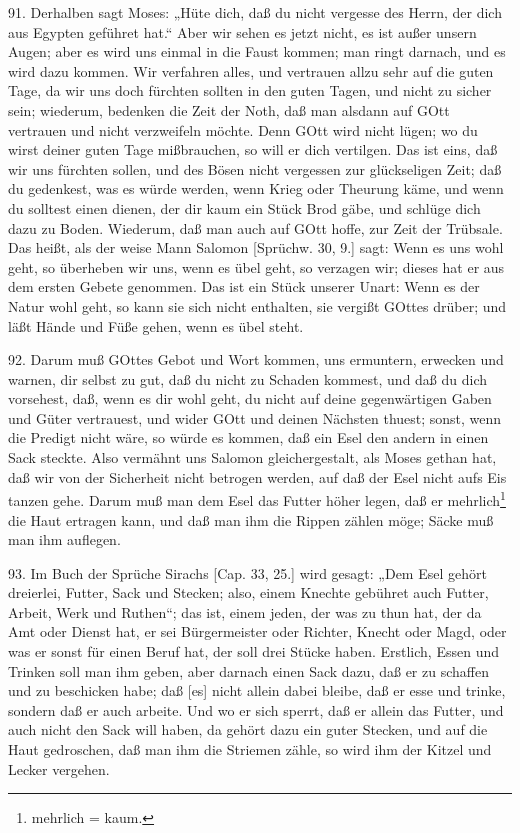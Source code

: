 91. Derhalben sagt Moses: „Hüte dich, daß du nicht vergesse des Herrn, der dich aus Egypten geführet hat.“ Aber wir sehen es jetzt nicht, es ist außer unsern Augen; aber es wird uns einmal in die Faust kommen; man ringt darnach, und es wird dazu kommen. Wir verfahren alles, und vertrauen allzu sehr auf die guten Tage, da wir uns doch fürchten sollten in den guten Tagen, und nicht zu sicher sein; wiederum, bedenken die Zeit der Noth, daß man alsdann auf GOtt vertrauen und nicht verzweifeln möchte. Denn GOtt wird nicht lügen; wo du wirst deiner guten Tage mißbrauchen, so will er dich vertilgen. Das ist eins, daß wir uns fürchten sollen, und des Bösen nicht vergessen zur glückseligen Zeit; daß du gedenkest, was es würde werden, wenn Krieg oder Theurung käme, und wenn du solltest einen dienen, der dir kaum ein Stück Brod gäbe, und schlüge dich dazu zu Boden. Wiederum, daß man auch auf GOtt hoffe, zur Zeit der Trübsale. Das heißt, als der weise Mann Salomon [Sprüchw. 30, 9.] sagt: Wenn es uns wohl geht, so überheben wir uns, wenn es übel geht, so verzagen wir; dieses hat er aus dem ersten Gebete genommen. Das ist ein Stück unserer Unart: Wenn es der Natur wohl geht, so kann sie sich nicht enthalten, sie vergißt GOttes drüber; und läßt Hände und Füße gehen, wenn es übel steht.

92. Darum muß GOttes Gebot und Wort kommen, uns ermuntern, erwecken und warnen, dir selbst zu gut, daß du nicht zu Schaden kommest, und daß du dich vorsehest, daß, wenn es dir wohl geht, du nicht auf deine gegenwärtigen Gaben und Güter vertrauest, und wider GOtt und deinen Nächsten thuest; sonst, wenn die Predigt nicht wäre, so würde es kommen, daß ein Esel den andern in einen Sack steckte. Also vermähnt uns Salomon gleichergestalt, als Moses gethan hat, daß wir von der Sicherheit nicht betrogen werden, auf daß der Esel nicht aufs Eis tanzen gehe. Darum muß man dem Esel das Futter höher legen, daß er mehrlich\footnote{mehrlich = kaum.} die Haut ertragen kann, und daß man ihm die Rippen zählen möge; Säcke muß man ihm auflegen.

93. Im Buch der Sprüche Sirachs [Cap. 33, 25.] wird gesagt: „Dem Esel gehört dreierlei, Futter, Sack und Stecken; also, einem Knechte gebühret auch Futter, Arbeit, Werk und Ruthen“; das ist, einem jeden, der was zu thun hat, der da Amt oder Dienst hat, er sei Bürgermeister oder Richter, Knecht oder Magd, oder was er sonst für einen Beruf hat, der soll drei Stücke haben. Erstlich, Essen und Trinken soll man ihm geben, aber darnach einen Sack dazu, daß er zu schaffen und zu beschicken habe; daß [es] nicht allein dabei bleibe, daß er esse und trinke, sondern daß er auch arbeite. Und wo er sich sperrt, daß er allein das Futter, und auch nicht den Sack will haben, da gehört dazu ein guter Stecken, und auf die Haut gedroschen, daß man ihm die Striemen zähle, so wird ihm der Kitzel und Lecker vergehen.

